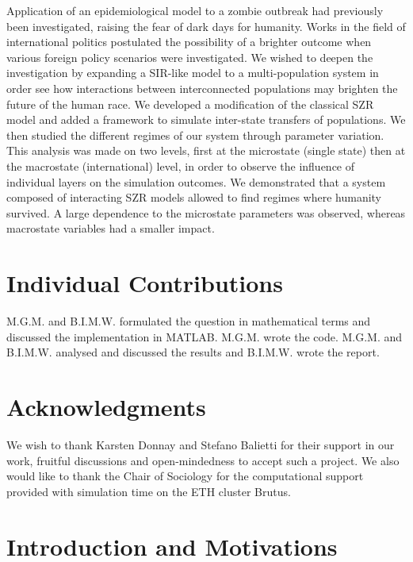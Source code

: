 \documentclass[11pt]{article} %
\begin{document}
Application of an epidemiological model to a zombie outbreak had previously been investigated, raising the fear of dark days for humanity. Works in the field of international politics postulated the possibility of a brighter outcome when various foreign policy scenarios were investigated. We wished to deepen the investigation by expanding a SIR-like model to a multi-population system in order see how interactions between interconnected populations may brighten the future of the human race. We developed a modification of the classical SZR model and added a framework to simulate inter-state transfers of populations. We then studied the different regimes of our system through parameter variation. This analysis was made on two levels, first at the microstate (single state) then at the macrostate (international) level, in order to observe the influence of individual layers on the simulation outcomes. We demonstrated that a system composed of interacting SZR models allowed to find regimes where humanity survived. A large dependence to the microstate parameters was observed, whereas macrostate variables had a smaller impact.  


\section{Individual Contributions}\indent

M.G.M. and B.I.M.W. formulated the question in mathematical terms and discussed the implementation in MATLAB. M.G.M. wrote the code. M.G.M. and B.I.M.W. analysed and discussed the results and B.I.M.W. wrote the report.

\section{Acknowledgments}\indent

We wish to thank Karsten Donnay and Stefano Balietti for their support in our work, fruitful discussions and open-mindedness to accept such a project. We also would like to thank the Chair of Sociology for the computational support provided with simulation time on the ETH cluster Brutus.







\newpage
\section{Introduction and Motivations}\indent
\end{document}
